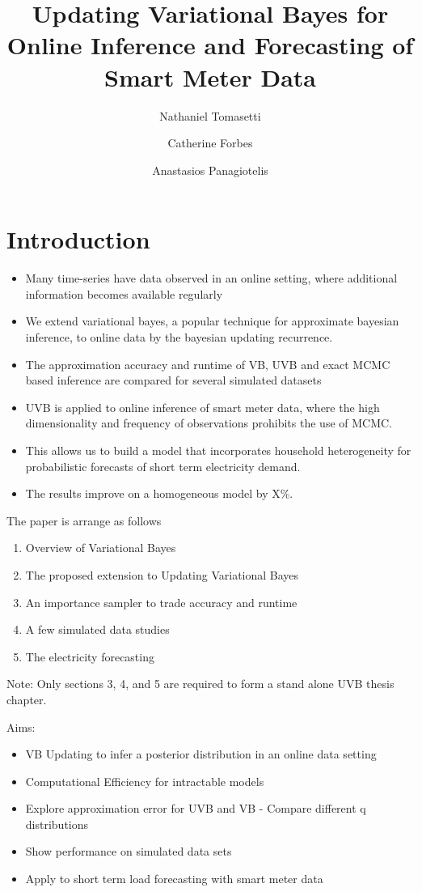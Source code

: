 \documentclass[12pt,a4paper]{article}\usepackage[]{graphicx}\usepackage[]{color}
\title{Updating Variational Bayes for Online Inference and Forecasting of Smart Meter Data}
\author{Nathaniel Tomasetti 
\and Catherine Forbes
\and Anastasios Panagiotelis}
\begin{document}
\maketitle



\section{Introduction}
\label{sec:intro}

\begin{itemize}
\item Many time-series have data observed in an online setting, where additional information becomes available regularly
\item We extend variational bayes, a popular technique for approximate bayesian inference, to online data by the bayesian updating recurrence.
\item The approximation accuracy and runtime of VB, UVB and exact MCMC based inference are compared for several simulated datasets
\item UVB is applied to online inference of smart meter data, where the high dimensionality and frequency of observations prohibits the use of MCMC.
\item This allows us to build a model that incorporates household heterogeneity for probabilistic forecasts of short term electricity demand.
\item The results improve on a homogeneous model by X\%.
\end{itemize}
The paper is arrange as follows
\begin{enumerate}
\item Overview of Variational Bayes
\item The proposed extension to Updating Variational Bayes
\item An importance sampler to trade accuracy and runtime
\item A few simulated data studies
\item The electricity forecasting
\end{enumerate}

Note: Only sections 3, 4, and 5 are required to form a stand alone UVB thesis chapter.

Aims:
\begin{itemize}
\item VB Updating to infer a posterior distribution in an online data setting
\item Computational Efficiency for intractable models
\item Explore approximation error for UVB and VB - Compare different q distributions
\item Show performance on simulated data sets
\item Apply to short term load forecasting with smart meter data
\end{itemize}
\end{document}
